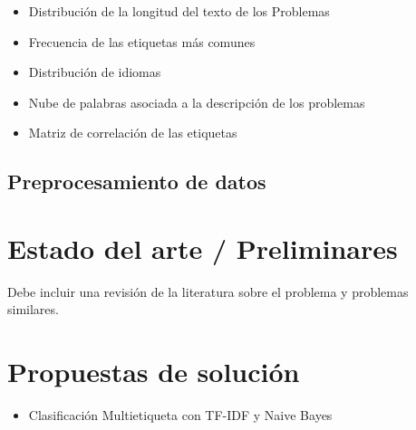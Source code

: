 \documentclass{article}
\begin{document}
\begin{itemize}
    \item Distribución de la longitud del texto de los Problemas
          \begin{center}
          \end{center}
          \newpage          
    \item Frecuencia de las etiquetas más comunes
          \begin{center}
          \end{center}
    \item Distribución de idiomas
          \begin{center}
          \end{center}
          \newpage
          
    \item Nube de palabras asociada a la descripción de los problemas
          \begin{center}
          \end{center}
    \item Matriz de correlación de las etiquetas
          \begin{center}
          \end{center}
\end{itemize}

\subsection{Preprocesamiento de datos}

\section{Estado del arte / Preliminares}

Debe incluir una revisión de la literatura sobre el problema y problemas similares.

\section{Propuestas de solución}

\begin{itemize}
    \item Clasificación Multietiqueta con TF-IDF y Naive Bayes
\end{itemize}
\end{document}
